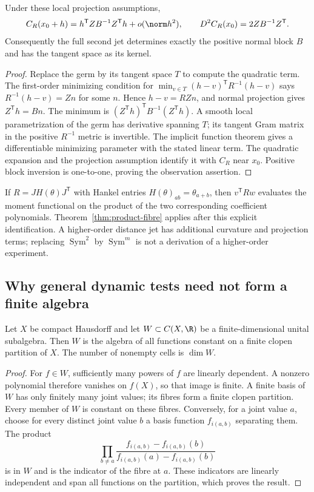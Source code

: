 \begin{proposition}\label{prop:normal-jet}
Under these local projection assumptions,
\[
 C_R(x_0+h)=h^{\mathsf T}ZB^{-1}Z^{\mathsf T}h+o(\norm h^2),
 \qquad D^2C_R(x_0)=2ZB^{-1}Z^{\mathsf T}.
\]
Consequently the full second jet determines exactly the positive normal
block $B$ and has the tangent space as its kernel.
\end{proposition}
\begin{proof}
Replace the germ by its tangent space $T$ to compute the quadratic term.
The first-order minimizing condition for $\min_{v\in T}(h-v)^{\mathsf T}
R^{-1}(h-v)$ says $R^{-1}(h-v)=Zn$ for some $n$. Hence
$h-v=RZn$, and normal projection gives $Z^{\mathsf T}h=Bn$.
The minimum is $(Z^{\mathsf T}h)^{\mathsf T}B^{-1}(Z^{\mathsf T}h)$.
A smooth local parametrization of the germ has derivative spanning $T$;
its tangent Gram matrix in the positive $R^{-1}$ metric is invertible.
The implicit function theorem gives a differentiable minimizing parameter
with the stated linear term. The quadratic expansion and the projection
assumption identify it with $C_R$ near $x_0$. Positive block inversion is
one-to-one, proving the observation assertion.
\end{proof}

If $R=JH(\theta)J^{\mathsf T}$ with Hankel entries
$H(\theta)_{ab}=\theta_{a+b}$, then $v^{\mathsf T}Rw$ evaluates the
moment functional on the product of the two corresponding coefficient
polynomials. Theorem~\ref{thm:product-fibre} applies after this explicit
identification. A higher-order distance jet has additional curvature and
projection terms; replacing $\operatorname{Sym}^2$ by
$\operatorname{Sym}^m$ is not a derivation of a higher-order experiment.

\subsection{Why general dynamic tests need not form a finite algebra}
\begin{proposition}
\label{prop:finite-algebra}
Let $X$ be compact Hausdorff and let $W\subset C(X,\R)$ be a finite-dimensional
unital subalgebra. Then $W$ is the algebra of all functions constant on a
finite clopen partition of $X$. The number of nonempty cells is $\dim W$.
\end{proposition}
\begin{proof}
For $f\in W$, sufficiently many powers of $f$ are linearly dependent.
A nonzero polynomial therefore vanishes on $f(X)$, so that image is finite.
A finite basis of $W$ has only finitely many joint values; its fibres form a
finite clopen partition. Every member of $W$ is constant on these fibres.
Conversely, for a joint value $a$, choose for every distinct joint value $b$
a basis function $f_{i(a,b)}$ separating them. The product
\[
 \prod_{b\ne a}
 \frac{f_{i(a,b)}-f_{i(a,b)}(b)}
      {f_{i(a,b)}(a)-f_{i(a,b)}(b)}
\]
is in $W$ and is the indicator of the fibre at $a$. These indicators are
linearly independent and span all functions on the partition, which proves
the result.
\end{proof}

